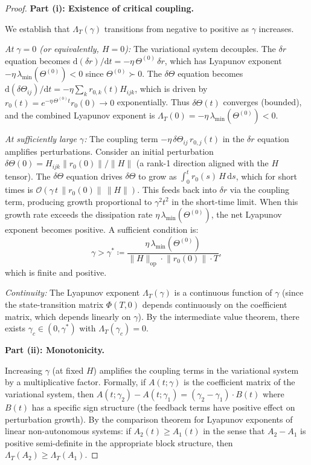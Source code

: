 \documentclass[11pt]{article}
\theoremstyle{definition}
\newcommand{\cO}{\mathcal{O}}
\newcommand{\norm}[1]{\lVert #1 \rVert}
\newcommand{\dd}{\mathrm{d}}
\renewcommand{\Theta}{\varTheta}
\begin{document}
\begin{proof}
\textbf{Part (i): Existence of critical coupling.}

We establish that $\Lambda_T(\gamma)$ transitions from negative to positive as $\gamma$ increases.

\emph{At $\gamma = 0$ (or equivalently, $H = 0$):} The variational system decouples. The $\delta r$ equation becomes $\dd(\delta r)/\dd t = -\eta\,\Theta^{(0)}\,\delta r$, which has Lyapunov exponent $-\eta\,\lambda_{\min}(\Theta^{(0)}) < 0$ since $\Theta^{(0)} \succ 0$. The $\delta\Theta$ equation becomes $\dd(\delta\Theta_{ij})/\dd t = -\eta \sum_k r_{0,k}(t) H_{ijk}$, which is driven by $r_0(t) = e^{-\eta\,\Theta^{(0)}t} r_0(0) \to 0$ exponentially. Thus $\delta\Theta(t)$ converges (bounded), and the combined Lyapunov exponent is $\Lambda_T(0) = -\eta\,\lambda_{\min}(\Theta^{(0)}) < 0$.

\emph{At sufficiently large $\gamma$:} The coupling term $-\eta\,\delta\Theta_{ij}\,r_{0,j}(t)$ in the $\delta r$ equation amplifies perturbations. Consider an initial perturbation $\delta\Theta(0) = H_{ijk} \norm{r_0(0)} / \norm{H}$ (a rank-1 direction aligned with the $H$ tensor). The $\delta\Theta$ equation drives $\delta\Theta$ to grow as $\int_0^t r_0(s)\,H\,\dd s$, which for short times is $\cO(\gamma\,t\,\norm{r_0(0)}\,\norm{H})$. This feeds back into $\delta r$ via the coupling term, producing growth proportional to $\gamma^2 t^2$ in the short-time limit. When this growth rate exceeds the dissipation rate $\eta\,\lambda_{\min}(\Theta^{(0)})$, the net Lyapunov exponent becomes positive. A sufficient condition is:
\begin{equation}
\gamma > \gamma^* \coloneqq \frac{\eta\,\lambda_{\min}(\Theta^{(0)})}{\norm{H}_{\mathrm{op}} \cdot \norm{r_0(0)} \cdot T},
\end{equation}
which is finite and positive.

\emph{Continuity:} The Lyapunov exponent $\Lambda_T(\gamma)$ is a continuous function of $\gamma$ (since the state-transition matrix $\Phi(T,0)$ depends continuously on the coefficient matrix, which depends linearly on $\gamma$). By the intermediate value theorem, there exists $\gamma_c \in (0, \gamma^*)$ with $\Lambda_T(\gamma_c) = 0$.

\textbf{Part (ii): Monotonicity.}

Increasing $\gamma$ (at fixed $H$) amplifies the coupling terms in the variational system by a multiplicative factor. Formally, if $A(t; \gamma)$ is the coefficient matrix of the variational system, then $A(t; \gamma_2) - A(t; \gamma_1) = (\gamma_2 - \gamma_1) \cdot B(t)$ where $B(t)$ has a specific sign structure (the feedback terms have positive effect on perturbation growth). By the comparison theorem for Lyapunov exponents of linear non-autonomous systems: if $A_2(t) \ge A_1(t)$ in the sense that $A_2 - A_1$ is positive semi-definite in the appropriate block structure, then $\Lambda_T(A_2) \ge \Lambda_T(A_1)$.


\end{proof}
\end{document}

